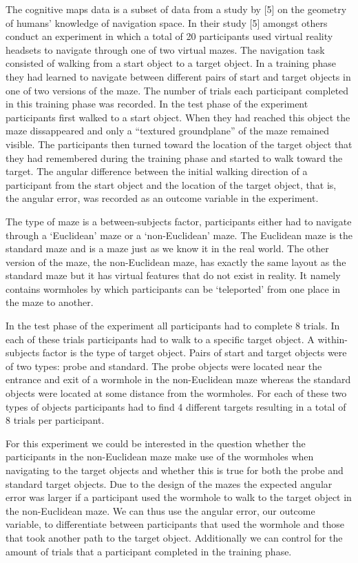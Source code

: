 \documentclass[11pt,]{article}
\begin{document}
The cognitive maps data is a subset of data from a study by {[}5{]} on
the geometry of humans' knowledge of navigation space. In their study
{[}5{]} amongst others conduct an experiment in which a total of 20
participants used virtual reality headsets to navigate through one of
two virtual mazes. The navigation task consisted of walking from a start
object to a target object. In a training phase they had learned to
navigate between different pairs of start and target objects in one of
two versions of the maze. The number of trials each participant
completed in this training phase was recorded. In the test phase of the
experiment participants first walked to a start object. When they had
reached this object the maze dissappeared and only a ``textured
groundplane'' of the maze remained visible. The participants then turned
toward the location of the target object that they had remembered during
the training phase and started to walk toward the target. The angular
difference between the initial walking direction of a participant from
the start object and the location of the target object, that is, the
angular error, was recorded as an outcome variable in the experiment.

The type of maze is a between-subjects factor, participants either had
to navigate through a `Euclidean' maze or a `non-Euclidean' maze. The
Euclidean maze is the standard maze and is a maze just as we know it in
the real world. The other version of the maze, the non-Euclidean maze,
has exactly the same layout as the standard maze but it has virtual
features that do not exist in reality. It namely contains wormholes by
which participants can be `teleported' from one place in the maze to
another.

In the test phase of the experiment all participants had to complete 8
trials. In each of these trials participants had to walk to a specific
target object. A within-subjects factor is the type of target object.
Pairs of start and target objects were of two types: probe and standard.
The probe objects were located near the entrance and exit of a wormhole
in the non-Euclidean maze whereas the standard objects were located at
some distance from the wormholes. For each of these two types of objects
participants had to find 4 different targets resulting in a total of 8
trials per participant.

For this experiment we could be interested in the question whether the
participants in the non-Euclidean maze make use of the wormholes when
navigating to the target objects and whether this is true for both the
probe and standard target objects. Due to the design of the mazes the
expected angular error was larger if a participant used the wormhole to
walk to the target object in the non-Euclidean maze. We can thus use the
angular error, our outcome variable, to differentiate between
participants that used the wormhole and those that took another path to
the target object. Additionally we can control for the amount of trials
that a participant completed in the training phase.
\end{document}
